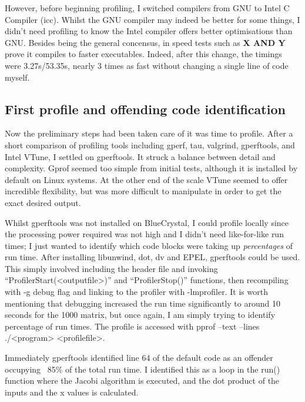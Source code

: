 \documentclass[10pt]{article}
\begin{document}
However, before beginning profiling, I switched compilers from GNU to
Intel C Compiler (icc). Whilst the GNU compiler may indeed be better
for some things, I didn't need profiling to know the Intel compiler
offers better optimisations than GNU. Besides being the general
concensus, in speed tests such as \textbf{X AND Y} prove it compiles
to faster executables. Indeed, after this change, the timings were
3.27s/53.35s, nearly 3 times as fast without changing a single line of
code myself.

\subsection{First profile and offending code identification}
Now the preliminary steps had been taken care of it was time to
profile. After a short comparison of profiling tools including gperf,
tau, valgrind, gperftools, and Intel VTune, I settled on
gperftools. It struck a balance between detail and complexity. Gprof
seemed too simple from initial tests, although it is installed by
default on Linux systems. At the other end of the scale VTune seemed
to offer incredible flexibility, but was more difficult to manipulate
in order to get the exact desired output.

Whilst gperftools was not installed on BlueCrystal, I could profile
locally since the processing power required was not high and I didn't
need like-for-like run times; I just wanted to identify which code
blocks were taking up \emph{percentages} of run time. After installing
libunwind, dot, dv and EPEL, gperftools could be used. This simply
involved including the header file and invoking
``ProfilerStart(<outputfile>)'' and ``ProfilerStop()'' functions, then
recompiling with -g debug flag and linking to the profiler with
-lmprofiler. It is worth mentioning that debugging increased the run
time significantly to around 10 seconds for the 1000 matrix, but once
again, I am simply trying to identify percentage of run times. The
profile is accessed with pprof --text --lines ./<program>
<profilefile>.

Immediately gperftools identified line 64 of the default code as an
offender occupying ~85\% of the total run time. I identified this as a
loop in the run() function where the Jacobi algorithm is executed, and
the dot product of the inputs and the x values is calculated.
\end{document}
